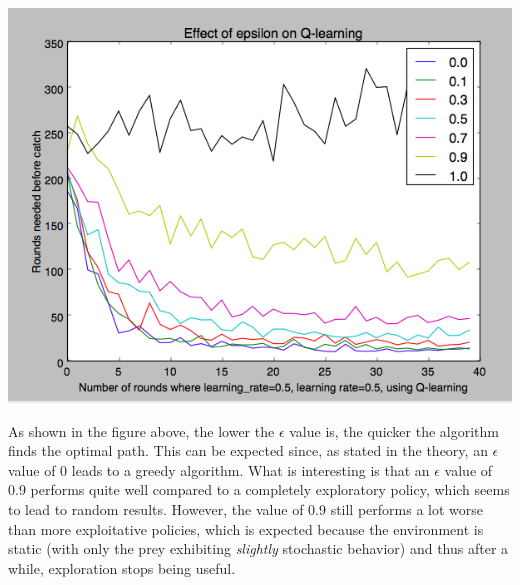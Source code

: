 \documentclass{article}
\begin{document}
\begin{center}
	\includegraphics[scale=0.4]{epsilons}
\end{center}

As shown in the figure above, the lower the $\epsilon$ value is, the quicker the algorithm finds the optimal path. This can be expected since, as stated in the theory, an $\epsilon$ value of 0 leads to a greedy algorithm. What is interesting is that an $\epsilon$ value of 0.9 performs quite well compared to a completely exploratory policy, which seems to lead to random results. However, the value of 0.9 still performs a lot worse than more exploitative policies, which is expected because the environment is static (with only the prey exhibiting \textit{slightly} stochastic behavior) and thus after a while, exploration stops being useful.
\end{document}
